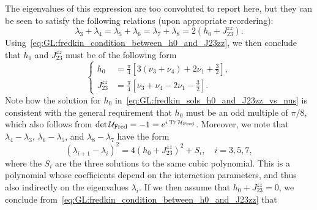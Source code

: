The eigenvalues of this expression are too convoluted to report here, but they can be seen to satisfy the following relations (upon appropriate reordering):
\begin{equation}
    \lambda_3 + \lambda_4
    = \lambda_5 + \lambda_6
    = \lambda_7 + \lambda_8 = 2(h_0 + J_{23}^{zz}).
\end{equation}
Using~\cref{eq:GL:fredkin_condition_between_h0_and_J23zz}, we then conclude that $h_0$ and $J_{23}^{zz}$ must be of the following form
\begin{equation}
\begin{cases}
    h_0 &= \frac{\pi}{4}\left[3(\nu_3+\nu_4) + 2\nu_1+\frac{3}{2}\right], \\
    J_{23}^{zz} &= \frac{\pi}{4}\left[\nu_3+\nu_4 - 2\nu_1-\frac{3}{2}\right].
\end{cases}
\label{eq:GL:fredkin_sols_h0_and_J23zz_vs_nus}
\end{equation}
Note how the solution for $h_0$ in~\cref{eq:GL:fredkin_sols_h0_and_J23zz_vs_nus} is consistent with the general requirement that $h_0$ must be an odd multiple of $\pi/8$, which also follows from $\det\UFred=-1=e^{i\Tr\HFred}$.
Moreover, we note that $\lambda_4-\lambda_3$, $\lambda_6-\lambda_5$, and $\lambda_8-\lambda_7$ have the form
\begin{equation}
    (\lambda_{i+1}-\lambda_i)^2 =
    4(h_0 + J_{23}^{zz})^2 + S_i,
    \quad i=3,5,7,
\end{equation}
where the $S_i$ are the three solutions to the same cubic polynomial. This is a polynomial whose coefficients depend on the interaction parameters, and thus also indirectly on the eigenvalues $\lambda_i$.
If we then assume that $h_0+J_{23}^{zz}=0$, we conclude from~\cref{eq:GL:fredkin_condition_between_h0_and_J23zz} that

